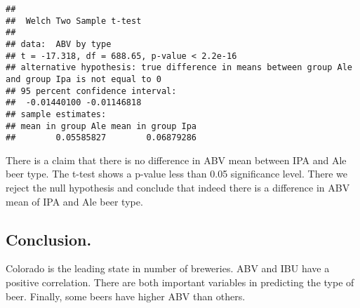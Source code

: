 \documentclass[
]{article}
\begin{document}
\begin{verbatim}
## 
##  Welch Two Sample t-test
## 
## data:  ABV by type
## t = -17.318, df = 688.65, p-value < 2.2e-16
## alternative hypothesis: true difference in means between group Ale and group Ipa is not equal to 0
## 95 percent confidence interval:
##  -0.01440100 -0.01146818
## sample estimates:
## mean in group Ale mean in group Ipa 
##        0.05585827        0.06879286
\end{verbatim}

There is a claim that there is no difference in ABV mean between IPA and
Ale beer type. The t-test shows a p-value less than 0.05 significance
level. There we reject the null hypothesis and conclude that indeed
there is a difference in ABV mean of IPA and Ale beer type.

\hypertarget{conclusion.}{%
\subsection{Conclusion.}\label{conclusion.}}

Colorado is the leading state in number of breweries. ABV and IBU have a
positive correlation. There are both important variables in predicting
the type of beer. Finally, some beers have higher ABV than others.
\end{document}
